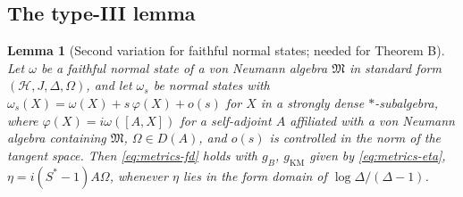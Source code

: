 \documentclass[11pt]{article}
\theoremstyle{accent}
\newtheorem{lemma}[theorem]{Lemma}
\theoremstyle{definition}
\newcommand{\cM}{\mathfrak{M}}
\begin{document}
\subsection{The type-III lemma}
\begin{lemma}[Second variation for faithful normal states; needed for Theorem B]\label{lem:second-variation}
Let \(\omega\) be a faithful normal state of a von Neumann algebra \(\cM\) in standard form \((\mathcal H,J,\Delta,\Omega)\), and let \(\omega_s\) be normal states with \(\omega_s(X)=\omega(X)+s\,\varphi(X)+o(s)\) for \(X\) in a strongly dense \(*\)-subalgebra, where \(\varphi(X)=i\omega([A,X])\) for a self-adjoint \(A\) affiliated with a von Neumann algebra containing \(\cM\), \(\Omega\in D(A)\), and \(o(s)\) is controlled in the norm of the tangent space.  Then \eqref{eq:metrics-fd} holds with \(g_B\), \(g_{\mathrm{KM}}\) given by \eqref{eq:metrics-eta}, \(\eta=i(S^*-1)A\Omega\), whenever \(\eta\) lies in the form domain of \(\log\Delta/(\Delta-1)\).
\end{lemma}
\end{document}
